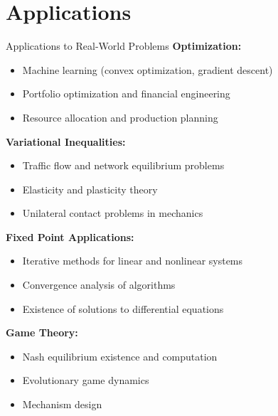 \documentclass[aspectratio=169,10pt]{beamer}
\begin{document}
\section{Applications}

\begin{frame}{Applications to Real-World Problems}
  \textbf{Optimization:}
  \begin{itemize}
    \item Machine learning (convex optimization, gradient descent)
    \item Portfolio optimization and financial engineering
    \item Resource allocation and production planning
  \end{itemize}

  \vspace{0.3cm}

  \textbf{Variational Inequalities:}
  \begin{itemize}
    \item Traffic flow and network equilibrium problems
    \item Elasticity and plasticity theory
    \item Unilateral contact problems in mechanics
  \end{itemize}

  \vspace{0.3cm}

  \textbf{Fixed Point Applications:}
  \begin{itemize}
    \item Iterative methods for linear and nonlinear systems
    \item Convergence analysis of algorithms
    \item Existence of solutions to differential equations
  \end{itemize}

  \vspace{0.3cm}

  \textbf{Game Theory:}
  \begin{itemize}
    \item Nash equilibrium existence and computation
    \item Evolutionary game dynamics
    \item Mechanism design
  \end{itemize}
\end{frame}
\end{document}
